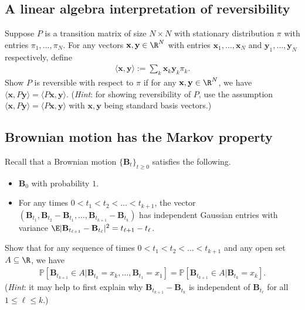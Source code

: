 \documentclass[12pt,reqno]{amsart}
\theoremstyle{definition}
\theoremstyle{remark}
\numberwithin{equation}{section}
\begin{document}
\subsection{A linear algebra interpretation of reversibility}
Suppose $P$ is a transition matrix of size $N\times N$ with stationary distribution $\pi$ with entries $\pi_{1},\ldots,\pi_{N}$. For any vectors $\mathbf{x},\mathbf{y}\in\R^{N}$ with entries $\mathbf{x}_{1},\ldots,\mathbf{x}_{N}$ and $\mathbf{y}_{1},\ldots,\mathbf{y}_{N}$ respectively, define 
%
\begin{align*}
\langle \mathbf{x},\mathbf{y}\rangle:=\sum_{k}\mathbf{x}_{k}\mathbf{y}_{k}\pi_{k}.
\end{align*}
%
Show $P$ is reversible with respect to $\pi$ if for any $\mathbf{x},\mathbf{y}\in\R^{N}$, we have $\langle\mathbf{x},P\mathbf{y}\rangle=\langle P\mathbf{x},\mathbf{y}\rangle$.  (\emph{Hint}: for showing reversibility of $P$, use the assumption $\langle\mathbf{x},P\mathbf{y}\rangle=\langle P\mathbf{x},\mathbf{y}\rangle$ with $\mathbf{x},\mathbf{y}$ being standard basis vectors.) 
\subsection{Brownian motion has the Markov property}
Recall that a Brownian motion $\{\mathbf{B}_{t}\}_{t\geq0}$ satisfies the following.
\begin{itemize}
\item $\mathbf{B}_{0}$ with probability $1$.
\item For any times $0<t_{1}<t_{2}<\ldots<t_{k+1}$, the vector $(\mathbf{B}_{t_{1}},\mathbf{B}_{t_{2}}-\mathbf{B}_{t_{1}},\ldots,\mathbf{B}_{t_{k+1}}-\mathbf{B}_{t_{k}})$ has independent Gaussian entries with variance $\E|\mathbf{B}_{t_{\ell+1}}-\mathbf{B}_{t_{\ell}}|^{2}=t_{\ell+1}-t_{\ell}$.
\end{itemize}
Show that for any sequence of times $0<t_{1}<t_{2}<\ldots<t_{k+1}$ and any open set $A\subseteq\R$, we have 
%
\begin{align*}
\mathbb{P}[\mathbf{B}_{t_{k+1}}\in A|\mathbf{B}_{t_{k}}=x_{k},\ldots,\mathbf{B}_{t_{1}}=x_{1}]=\mathbb{P}[\mathbf{B}_{t_{k+1}}\in A|\mathbf{B}_{t_{k}}=x_{k}].
\end{align*}
%
(\emph{Hint}: it may help to first explain why $\mathbf{B}_{t_{k+1}}-\mathbf{B}_{t_{k}}$ is independent of $\mathbf{B}_{t_{\ell}}$ for all $1\leq\ell\leq k$.)
\end{document}
